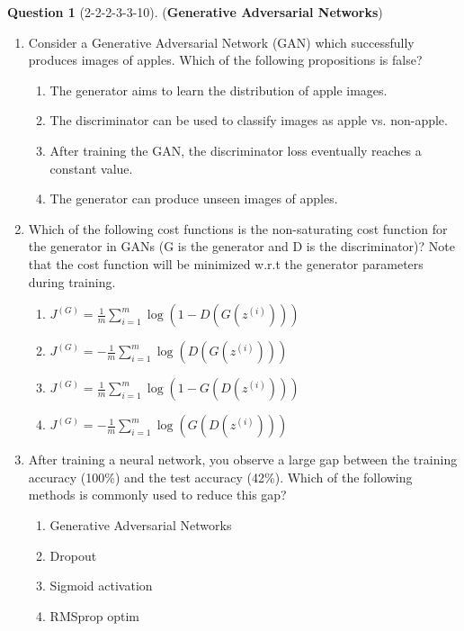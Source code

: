 \documentclass[12pt]{article}
\newif\ifsolution
\theoremstyle{definition}
\newtheorem{exercise}{Question}%
\newtheorem{answer}{Answer} %
\newcommand{\Answer}[1]{
\ifsolution
\begin{answer}#1\end{answer}
\fi
}
\begin{document}
\Answer{



  answer here
}
\begin{exercise}[2-2-2-3-3-10] (\textbf{Generative Adversarial Networks})
\begin{enumerate}
    \item Consider a Generative Adversarial Network (GAN) which successfully produces images of apples. Which of the following propositions is false?
    \begin{enumerate}
        \item The generator aims to learn the distribution of apple images.
        \item The discriminator can be used to classify images as apple vs. non-apple.
        \item After training the GAN, the discriminator loss eventually reaches a constant value.
        \item The generator can produce unseen images of apples.
    \end{enumerate}

    \item Which of the following cost functions is the non-saturating cost function for the generator in GANs (G is the generator and D is the discriminator)? Note that the cost function will be minimized w.r.t the generator parameters during training.
    \begin{enumerate}
        \item $J^{(G)} = \frac{1}{m} \sum_{i=1}^{m} \log (1 - D(G(z^{(i)})))$
        \item $J^{(G)} = -\frac{1}{m} \sum_{i=1}^{m} \log (D(G(z^{(i)})))$
        \item $J^{(G)} = \frac{1}{m} \sum_{i=1}^{m} \log (1 - G(D(z^{(i)})))$
        \item $J^{(G)} = -\frac{1}{m} \sum_{i=1}^{m} \log (G(D(z^{(i)})))$
    \end{enumerate}

    \item After training a neural network, you observe a large gap between the training accuracy (100\%) and the test accuracy (42\%). Which of the following methods is commonly used to reduce this gap?
    \begin{enumerate}
        \item Generative Adversarial Networks
        \item Dropout
        \item Sigmoid activation
        \item RMSprop optim
    \end{enumerate}


\end{enumerate}
\end{exercise}
\end{document}
